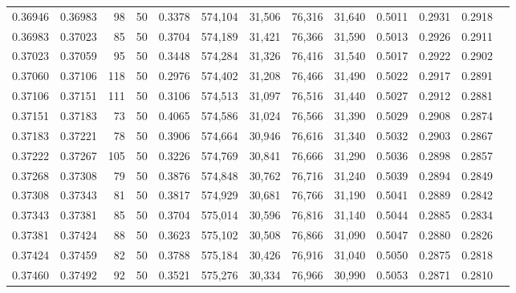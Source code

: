 \begin{tabular}{rrrrrrrrrrrrr}
0.36946 & 0.36983 &    98 &  50 &                                     0.3378 & 574,104 &  31,506 &  76,316 &  31,640 & 0.5011 & 0.2931 & 0.2918 \\
0.36983 & 0.37023 &    85 &  50 &                                     0.3704 & 574,189 &  31,421 &  76,366 &  31,590 & 0.5013 & 0.2926 & 0.2911 \\
0.37023 & 0.37059 &    95 &  50 &                                     0.3448 & 574,284 &  31,326 &  76,416 &  31,540 & 0.5017 & 0.2922 & 0.2902 \\
0.37060 & 0.37106 &   118 &  50 &                                     0.2976 & 574,402 &  31,208 &  76,466 &  31,490 & 0.5022 & 0.2917 & 0.2891 \\
0.37106 & 0.37151 &   111 &  50 &                                     0.3106 & 574,513 &  31,097 &  76,516 &  31,440 & 0.5027 & 0.2912 & 0.2881 \\
0.37151 & 0.37183 &    73 &  50 &                                     0.4065 & 574,586 &  31,024 &  76,566 &  31,390 & 0.5029 & 0.2908 & 0.2874 \\
0.37183 & 0.37221 &    78 &  50 &                                     0.3906 & 574,664 &  30,946 &  76,616 &  31,340 & 0.5032 & 0.2903 & 0.2867 \\
0.37222 & 0.37267 &   105 &  50 &                                     0.3226 & 574,769 &  30,841 &  76,666 &  31,290 & 0.5036 & 0.2898 & 0.2857 \\
0.37268 & 0.37308 &    79 &  50 &                                     0.3876 & 574,848 &  30,762 &  76,716 &  31,240 & 0.5039 & 0.2894 & 0.2849 \\
0.37308 & 0.37343 &    81 &  50 &                                     0.3817 & 574,929 &  30,681 &  76,766 &  31,190 & 0.5041 & 0.2889 & 0.2842 \\
0.37343 & 0.37381 &    85 &  50 &                                     0.3704 & 575,014 &  30,596 &  76,816 &  31,140 & 0.5044 & 0.2885 & 0.2834 \\
0.37381 & 0.37424 &    88 &  50 &                                     0.3623 & 575,102 &  30,508 &  76,866 &  31,090 & 0.5047 & 0.2880 & 0.2826 \\
0.37424 & 0.37459 &    82 &  50 &                                     0.3788 & 575,184 &  30,426 &  76,916 &  31,040 & 0.5050 & 0.2875 & 0.2818 \\
0.37460 & 0.37492 &    92 &  50 &                                     0.3521 & 575,276 &  30,334 &  76,966 &  30,990 & 0.5053 & 0.2871 & 0.2810 \\

\end{tabular}
